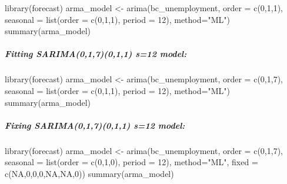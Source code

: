 \documentclass[
  letterpaper,
  DIV=11,
  numbers=noendperiod]{scrartcl}
\let\oldsubparagraph\subparagraph
\renewcommand{\subparagraph}[1]{\oldsubparagraph{#1}\mbox{}}
\newenvironment{Shaded}{\begin{snugshade}}{\end{snugshade}}
\newcommand{\AttributeTok}[1]{\textcolor[rgb]{0.40,0.45,0.13}{#1}}
\newcommand{\ConstantTok}[1]{\textcolor[rgb]{0.56,0.35,0.01}{#1}}
\newcommand{\DecValTok}[1]{\textcolor[rgb]{0.68,0.00,0.00}{#1}}
\newcommand{\FunctionTok}[1]{\textcolor[rgb]{0.28,0.35,0.67}{#1}}
\newcommand{\NormalTok}[1]{\textcolor[rgb]{0.00,0.23,0.31}{#1}}
\newcommand{\OtherTok}[1]{\textcolor[rgb]{0.00,0.23,0.31}{#1}}
\newcommand{\StringTok}[1]{\textcolor[rgb]{0.13,0.47,0.30}{#1}}
\begin{document}
\begin{Shaded}
\begin{Highlighting}[]
\FunctionTok{library}\NormalTok{(forecast)}
\NormalTok{arma\_model }\OtherTok{\textless{}{-}} \FunctionTok{arima}\NormalTok{(bc\_unemployment, }\AttributeTok{order =} \FunctionTok{c}\NormalTok{(}\DecValTok{0}\NormalTok{,}\DecValTok{1}\NormalTok{,}\DecValTok{1}\NormalTok{), }\AttributeTok{seasonal =} \FunctionTok{list}\NormalTok{(}\AttributeTok{order =} \FunctionTok{c}\NormalTok{(}\DecValTok{0}\NormalTok{,}\DecValTok{1}\NormalTok{,}\DecValTok{1}\NormalTok{), }\AttributeTok{period =} \DecValTok{12}\NormalTok{), }\AttributeTok{method=}\StringTok{"ML"}\NormalTok{)}
\FunctionTok{summary}\NormalTok{(arma\_model)}
\end{Highlighting}
\end{Shaded}

\hypertarget{fitting-sarima017011-s12-model}{%
\subparagraph{Fitting SARIMA(0,1,7)(0,1,1) s=12
model:}\label{fitting-sarima017011-s12-model}}

\begin{Shaded}
\begin{Highlighting}[]
\FunctionTok{library}\NormalTok{(forecast) }
\NormalTok{arma\_model }\OtherTok{\textless{}{-}} \FunctionTok{arima}\NormalTok{(bc\_unemployment, }\AttributeTok{order =} \FunctionTok{c}\NormalTok{(}\DecValTok{0}\NormalTok{,}\DecValTok{1}\NormalTok{,}\DecValTok{7}\NormalTok{), }\AttributeTok{seasonal =} \FunctionTok{list}\NormalTok{(}\AttributeTok{order =} \FunctionTok{c}\NormalTok{(}\DecValTok{0}\NormalTok{,}\DecValTok{1}\NormalTok{,}\DecValTok{1}\NormalTok{), }\AttributeTok{period =} \DecValTok{12}\NormalTok{), }\AttributeTok{method=}\StringTok{"ML"}\NormalTok{) }
\FunctionTok{summary}\NormalTok{(arma\_model)}
\end{Highlighting}
\end{Shaded}

\hypertarget{fixing-sarima017011-s12-model}{%
\subparagraph{Fixing SARIMA(0,1,7)(0,1,1) s=12
model:}\label{fixing-sarima017011-s12-model}}

\begin{Shaded}
\begin{Highlighting}[]
\FunctionTok{library}\NormalTok{(forecast)}
\NormalTok{arma\_model }\OtherTok{\textless{}{-}} \FunctionTok{arima}\NormalTok{(bc\_unemployment, }\AttributeTok{order =} \FunctionTok{c}\NormalTok{(}\DecValTok{0}\NormalTok{,}\DecValTok{1}\NormalTok{,}\DecValTok{7}\NormalTok{), }\AttributeTok{seasonal =} \FunctionTok{list}\NormalTok{(}\AttributeTok{order =} \FunctionTok{c}\NormalTok{(}\DecValTok{0}\NormalTok{,}\DecValTok{1}\NormalTok{,}\DecValTok{0}\NormalTok{), }\AttributeTok{period =} \DecValTok{12}\NormalTok{), }\AttributeTok{method=}\StringTok{"ML"}\NormalTok{, }\AttributeTok{fixed =} \FunctionTok{c}\NormalTok{(}\ConstantTok{NA}\NormalTok{,}\DecValTok{0}\NormalTok{,}\DecValTok{0}\NormalTok{,}\DecValTok{0}\NormalTok{,}\ConstantTok{NA}\NormalTok{,}\ConstantTok{NA}\NormalTok{,}\DecValTok{0}\NormalTok{))}
\FunctionTok{summary}\NormalTok{(arma\_model)}
\end{Highlighting}
\end{Shaded}
\end{document}
